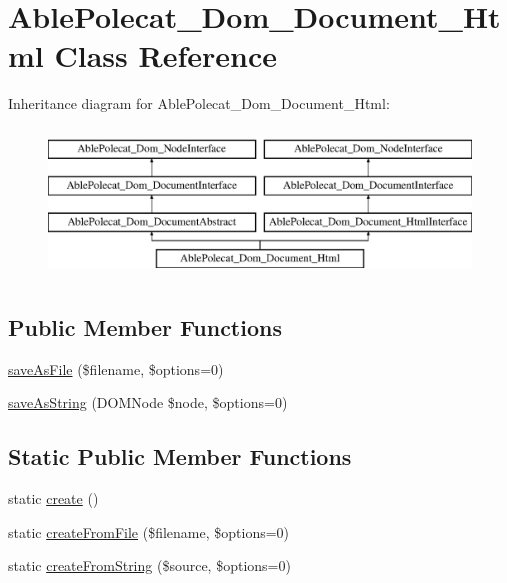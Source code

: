 \hypertarget{class_able_polecat___dom___document___html}{}\section{Able\+Polecat\+\_\+\+Dom\+\_\+\+Document\+\_\+\+Html Class Reference}
\label{class_able_polecat___dom___document___html}
Inheritance diagram for Able\+Polecat\+\_\+\+Dom\+\_\+\+Document\+\_\+\+Html\+:\begin{figure}[H]
\begin{center}
\leavevmode
\includegraphics[height=4.000000cm]{class_able_polecat___dom___document___html}
\end{center}
\end{figure}
\subsection*{Public Member Functions}
\begin{DoxyCompactItemize}
\item 
\hyperlink{class_able_polecat___dom___document___html_af3bb53733978ca9f7b6883b5ec65a67f}{save\+As\+File} (\$filename, \$options=0)
\item 
\hyperlink{class_able_polecat___dom___document___html_af12ec29a0fd36c8b977895a2ea7ef95e}{save\+As\+String} (D\+O\+M\+Node \$node, \$options=0)
\end{DoxyCompactItemize}
\subsection*{Static Public Member Functions}
\begin{DoxyCompactItemize}
\item 
static \hyperlink{class_able_polecat___dom___document___html_a239b1c70258014a86569483c2d009de6}{create} ()
\item 
static \hyperlink{class_able_polecat___dom___document___html_afddfc3d9b5456225cd1c4bb66e296342}{create\+From\+File} (\$filename, \$options=0)
\item 
static \hyperlink{class_able_polecat___dom___document___html_a01f8bd6cfb92479f18bce6243cde7aa0}{create\+From\+String} (\$source, \$options=0)
\end{DoxyCompactItemize}
